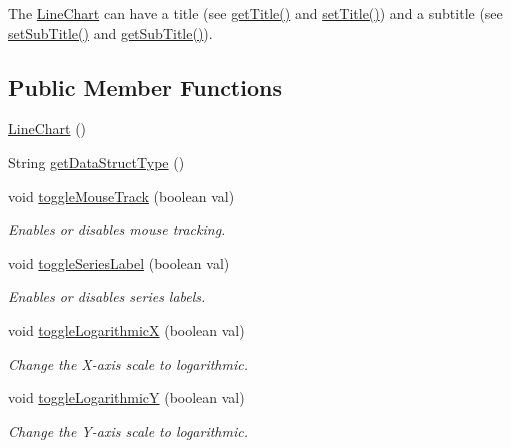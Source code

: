 The \mbox{\hyperlink{classbridges_1_1base_1_1_line_chart}{Line\+Chart}} can have a title (see \mbox{\hyperlink{classbridges_1_1base_1_1_line_chart_aedc5f75b158298b755ba0c31bcf84138}{get\+Title()}} and \mbox{\hyperlink{classbridges_1_1base_1_1_line_chart_a893519da804666988c49b918c87da2a2}{set\+Title()}}) and a subtitle (see \mbox{\hyperlink{classbridges_1_1base_1_1_line_chart_ad24bfdd49194f8e152fdb80e039762ad}{set\+Sub\+Title()}} and \mbox{\hyperlink{classbridges_1_1base_1_1_line_chart_a102006e90f2a226886538db0eeda6b08}{get\+Sub\+Title()}}). \subsection*{Public Member Functions}
\begin{DoxyCompactItemize}
\item 
\mbox{\hyperlink{classbridges_1_1base_1_1_line_chart_ae864fe5ae85e80ae2f035471fb216e68}{Line\+Chart}} ()
\item 
String \mbox{\hyperlink{classbridges_1_1base_1_1_line_chart_ae5d7ebffc6f29256f6fff368ef9a6c84}{get\+Data\+Struct\+Type}} ()
\item 
void \mbox{\hyperlink{classbridges_1_1base_1_1_line_chart_a095d16c1544cf373b8d2bf68ca864bd9}{toggle\+Mouse\+Track}} (boolean val)
\begin{DoxyCompactList}\small\item\em Enables or disables mouse tracking. \end{DoxyCompactList}\item 
void \mbox{\hyperlink{classbridges_1_1base_1_1_line_chart_adae74cfb09585727a96cf74ddf74d098}{toggle\+Series\+Label}} (boolean val)
\begin{DoxyCompactList}\small\item\em Enables or disables series labels. \end{DoxyCompactList}\item 
void \mbox{\hyperlink{classbridges_1_1base_1_1_line_chart_ad3e5e54c382ac605a81b6b61c250ad16}{toggle\+LogarithmicX}} (boolean val)
\begin{DoxyCompactList}\small\item\em Change the X-\/axis scale to logarithmic. \end{DoxyCompactList}\item 
void \mbox{\hyperlink{classbridges_1_1base_1_1_line_chart_a7946f217a7b3567ee1a1bd8266ed43ca}{toggle\+LogarithmicY}} (boolean val)
\begin{DoxyCompactList}\small\item\em Change the Y-\/axis scale to logarithmic. \end{DoxyCompactList}\item 

\end{DoxyCompactItemize}
